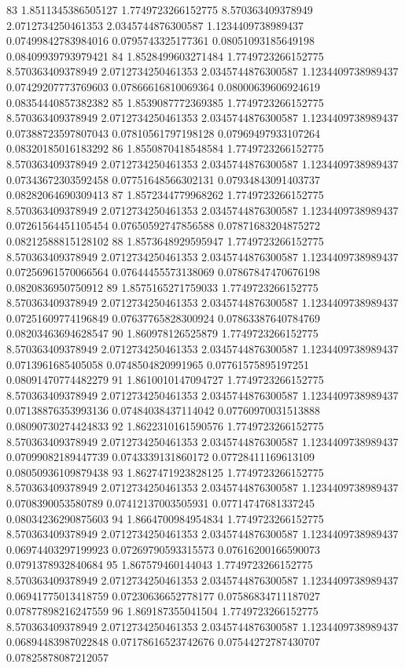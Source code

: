 {83 1.8511345386505127 1.7749723266152775 8.570363409378949 2.0712734250461353 2.0345744876300587 1.1234409738989437 0.07499842783984016 0.0795743325177361 0.08051093185649198 0.08409939793979421
84 1.8528499603271484 1.7749723266152775 8.570363409378949 2.0712734250461353 2.0345744876300587 1.1234409738989437 0.07429207773769603 0.07866616810069364 0.08000639606924619 0.08354440857382382
85 1.8539087772369385 1.7749723266152775 8.570363409378949 2.0712734250461353 2.0345744876300587 1.1234409738989437 0.07388723597807043 0.07810561797198128 0.07969497933107264 0.08320185016183292
86 1.8550870418548584 1.7749723266152775 8.570363409378949 2.0712734250461353 2.0345744876300587 1.1234409738989437 0.07343672303592458 0.07751648566302131 0.07934843091403737 0.08282064690309413
87 1.8572344779968262 1.7749723266152775 8.570363409378949 2.0712734250461353 2.0345744876300587 1.1234409738989437 0.07261564451105454 0.07650592747856588 0.07871683204875272 0.08212588815128102
88 1.8573648929595947 1.7749723266152775 8.570363409378949 2.0712734250461353 2.0345744876300587 1.1234409738989437 0.07256961570066564 0.07644455573138069 0.07867847470676198 0.0820836950750912
89 1.8575165271759033 1.7749723266152775 8.570363409378949 2.0712734250461353 2.0345744876300587 1.1234409738989437 0.07251609774196849 0.07637765828300924 0.07863387640784769 0.08203463694628547
90 1.860978126525879 1.7749723266152775 8.570363409378949 2.0712734250461353 2.0345744876300587 1.1234409738989437 0.0713961685405058 0.0748504820991965 0.07761575895197251 0.08091470774482279
91 1.8610010147094727 1.7749723266152775 8.570363409378949 2.0712734250461353 2.0345744876300587 1.1234409738989437 0.07138876353993136 0.07484038437114042 0.07760970031513888 0.08090730274424833
92 1.8622310161590576 1.7749723266152775 8.570363409378949 2.0712734250461353 2.0345744876300587 1.1234409738989437 0.07099082189447739 0.0743339131860172 0.07728411169613109 0.08050936109879438
93 1.8627471923828125 1.7749723266152775 8.570363409378949 2.0712734250461353 2.0345744876300587 1.1234409738989437 0.0708390053580789 0.07412137003505931 0.07714747681337245 0.08034236290875603
94 1.8664700984954834 1.7749723266152775 8.570363409378949 2.0712734250461353 2.0345744876300587 1.1234409738989437 0.06974403297199923 0.07269790593315573 0.07616200166590073 0.0791378932840684
95 1.867579460144043 1.7749723266152775 8.570363409378949 2.0712734250461353 2.0345744876300587 1.1234409738989437 0.06941775013418759 0.07230636652778177 0.07586834711187027 0.07877898216247559
96 1.869187355041504 1.7749723266152775 8.570363409378949 2.0712734250461353 2.0345744876300587 1.1234409738989437 0.06894483987022848 0.07178616523742676 0.07544272787430707 0.07825878087212057
}
